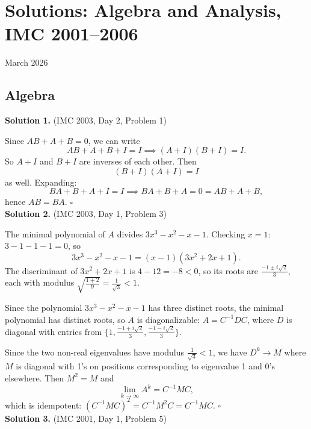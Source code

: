 \documentclass{article}
\begin{document}
\pagestyle{plain}

\section*{Solutions: Algebra and Analysis, IMC 2001--2006}

\begin{center}
March 2026
\end{center}

\subsection*{Algebra}

\textbf{Solution 1.} (IMC 2003, Day 2, Problem 1)

Since \( AB + A + B = 0 \), we can write
\[
AB + A + B + I = I \implies (A + I)(B + I) = I.
\]
So \( A + I \) and \( B + I \) are inverses of each other. Then
\[
(B + I)(A + I) = I
\]
as well. Expanding:
\[
BA + B + A + I = I \implies BA + B + A = 0 = AB + A + B,
\]
hence \( AB = BA \). \hfill\(\square\)
\\

\textbf{Solution 2.} (IMC 2003, Day 1, Problem 3)

The minimal polynomial of \( A \) divides \( 3x^3 - x^2 - x - 1 \). Checking \( x = 1 \):
\( 3 - 1 - 1 - 1 = 0 \), so
\[
3x^3 - x^2 - x - 1 = (x - 1)(3x^2 + 2x + 1).
\]
The discriminant of \( 3x^2 + 2x + 1 \) is \( 4 - 12 = -8 < 0 \), so its roots are
\( \frac{-1 \pm i\sqrt{2}}{3} \), each with modulus \( \sqrt{\frac{1 + 2}{9}} = \frac{1}{\sqrt{3}} < 1 \).

Since the polynomial \( 3x^3 - x^2 - x - 1 \) has three distinct roots, the minimal polynomial has distinct roots, so \( A \) is diagonalizable:
\( A = C^{-1}DC \), where \( D \) is diagonal with entries from \( \{1, \frac{-1+i\sqrt{2}}{3}, \frac{-1-i\sqrt{2}}{3}\} \).

Since the two non-real eigenvalues have modulus \( \frac{1}{\sqrt{3}} < 1 \), we have \( D^k \to M \) where \( M \) is diagonal with 1's on positions corresponding to eigenvalue 1 and 0's elsewhere. Then \( M^2 = M \) and
\[
\lim_{k\to\infty} A^k = C^{-1}MC,
\]
which is idempotent: \( (C^{-1}MC)^2 = C^{-1}M^2C = C^{-1}MC \). \hfill\(\square\)
\\

\textbf{Solution 3.} (IMC 2001, Day 1, Problem 5)
\end{document}
